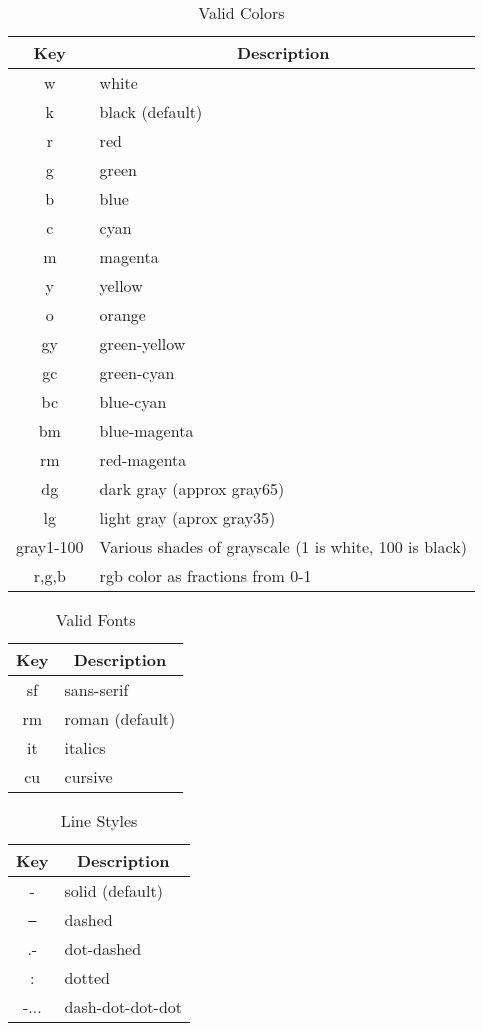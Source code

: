 \documentclass[12pt]{article}
\begin{document}
\begin{table}
\caption{\label{tab:colors} Valid Colors}
\begin{center}
\begin{tabular}{cl}
\hline
\hline
\multicolumn{1}{c}{Key} & \multicolumn{1}{c}{Description}\\
\hline
w  & white\\
k  & black (default)\\
r  & red\\
g  & green\\
b  & blue\\
c  & cyan\\
m  & magenta\\
y  & yellow\\
o  & orange\\
gy & green-yellow\\
gc & green-cyan\\
bc & blue-cyan\\
bm & blue-magenta\\
rm & red-magenta\\
dg & dark gray (approx gray65)\\
lg & light gray (aprox gray35)\\
gray1-100 & Various shades of grayscale (1 is white, 100 is black)\\
r,g,b & rgb color as fractions from 0-1 \\
\hline
\end{tabular}
\end{center}
\end{table}

\begin{table}
\caption{\label{tab:fonts} Valid Fonts}
\begin{center}
\begin{tabular}{cl}
\hline
\hline
\multicolumn{1}{c}{Key} & \multicolumn{1}{c}{Description}\\
\hline
sf & sans-serif\\
rm & roman (default)\\
it & italics\\
cu & cursive\\
\hline
\end{tabular}
\end{center}
\end{table}

\begin{table}
\caption{\label{tab:lstyles} Line Styles}
\begin{center}
\begin{tabular}{cl}
\hline
\hline
\multicolumn{1}{c}{Key} & \multicolumn{1}{c}{Description}\\
\hline
  -  & solid (default)\\
 \texttt{--}  & dashed\\
 .-  & dot-dashed\\
  :  & dotted\\
-... & dash-dot-dot-dot\\
\hline
\end{tabular}
\end{center}
\end{table}
\end{document}
